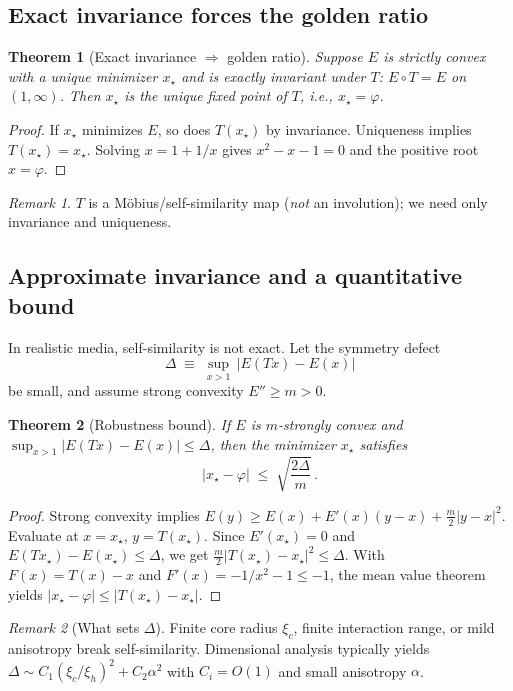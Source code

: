 \documentclass[11pt]{article}
\newtheorem{theorem}{Theorem}
\theoremstyle{remark}
\newtheorem{remark}{Remark}
\theoremstyle{definition}
\newcommand{\ph}{\varphi}
\begin{document}
\subsection{Exact invariance forces the golden ratio}
\begin{theorem}[Exact invariance $\Rightarrow$ golden ratio]
Suppose $E$ is strictly convex with a unique minimizer $x_\star$ and is exactly invariant under $T$: $E\circ T=E$ on $(1,\infty)$. Then $x_\star$ is the unique fixed point of $T$, i.e., $x_\star=\ph$.
\end{theorem}
\begin{proof}
If $x_\star$ minimizes $E$, so does $T(x_\star)$ by invariance. Uniqueness implies $T(x_\star)=x_\star$. Solving $x=1+1/x$ gives $x^2-x-1=0$ and the positive root $x=\ph$.
\end{proof}
\begin{remark}
$T$ is a M\"obius/self-similarity map (\emph{not} an involution); we need only invariance and uniqueness.
\end{remark}

\subsection{Approximate invariance and a quantitative bound}
In realistic media, self-similarity is not exact. Let the symmetry defect
\begin{equation}
 \Delta\;\equiv\;\sup_{x>1}\,\bigl|E(Tx)-E(x)\bigr|
\end{equation}
be small, and assume strong convexity $E''\ge m>0$.
\begin{theorem}[Robustness bound]
\label{thm:robust}
If $E$ is $m$-strongly convex and $\sup_{x>1}|E(Tx)-E(x)|\le \Delta$, then the minimizer $x_\star$ satisfies
\begin{equation}
 \bigl|x_\star-\ph\bigr|\;\le\;\sqrt{\frac{2\Delta}{m}}\,.
\end{equation}
\end{theorem}
\begin{proof}
Strong convexity implies $E(y)\ge E(x)+E'(x)(y-x)+\tfrac{m}{2}|y-x|^2$. Evaluate at $x=x_\star$, $y=T(x_\star)$. Since $E'(x_\star)=0$ and $E(Tx_\star)-E(x_\star)\le \Delta$, we get $\tfrac{m}{2}|T(x_\star)-x_\star|^2\le \Delta$. With $F(x)=T(x)-x$ and $F'(x)=-1/x^2-1\le-1$, the mean value theorem yields $|x_\star-\ph|\le |T(x_\star)-x_\star|$.
\end{proof}
\begin{remark}[What sets $\Delta$]
Finite core radius $\xi_c$, finite interaction range, or mild anisotropy break self-similarity. Dimensional analysis typically yields $\Delta\sim C_1(\xi_c/\xi_h)^2 + C_2\alpha^2$ with $C_i=O(1)$ and small anisotropy $\alpha$.
\end{remark}
\end{document}
